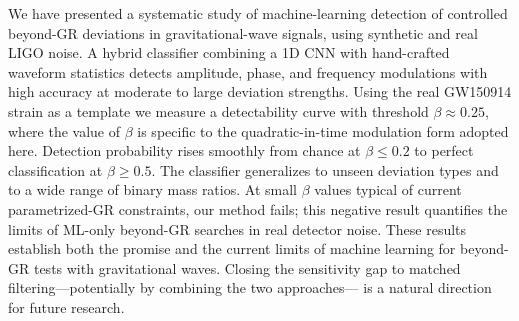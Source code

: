 We have presented a systematic study of machine-learning detection of
controlled beyond-GR deviations in gravitational-wave signals, using
synthetic and real LIGO noise. A hybrid classifier combining a 1D CNN
with hand-crafted waveform statistics detects amplitude, phase, and
frequency modulations with high accuracy at moderate to large
deviation strengths. Using the real GW150914 strain as a template we
measure a detectability curve with threshold $\beta \approx 0.25$,
where the value of $\beta$ is specific to the quadratic-in-time
modulation form adopted here. Detection probability rises smoothly
from chance at $\beta \leq 0.2$ to perfect classification at
$\beta \geq 0.5$. The classifier generalizes to unseen deviation
types and to a wide range of binary mass ratios. At small $\beta$
values typical of current parametrized-GR constraints, our method
fails; this negative result quantifies the limits of ML-only
beyond-GR searches in real detector noise. These results establish
both the promise and the current limits of machine learning for
beyond-GR tests with gravitational waves. Closing the sensitivity gap
to matched filtering---potentially by combining the two approaches---
is a natural direction for future research.
